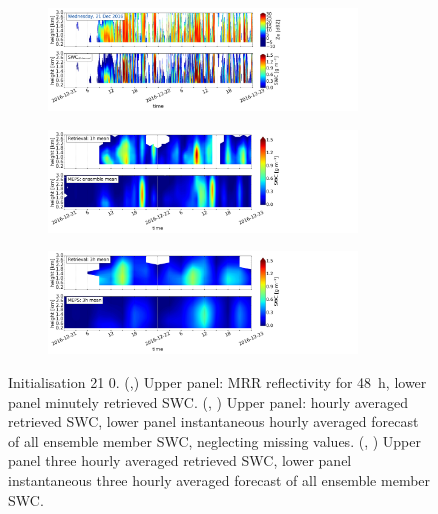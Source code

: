 \begin{figure}[ht!]
	\centering
	\begin{subfigure}[t]{\textwidth}
		\centering
		\includegraphics[trim={0.cm 2.2cm 19.cm 0.5cm},clip,width=0.9\textwidth]{./fig_obs_ret/20161221}
		\caption{}\label{fig:SWC:ret_21}
	\end{subfigure}
	\begin{subfigure}[t]{\textwidth}
		\centering
		\includegraphics[trim={0.cm 2.2cm 19.cm 0.5cm},clip,width=0.9\textwidth]{./fig_vert_SWC_EM/20161221}
		\caption{}\label{fig:SWC_EM:21}
	\end{subfigure}
	\begin{subfigure}[t]{\textwidth}
		\centering
		\includegraphics[trim={0.cm 0.8cm 19.cm 0.5cm},clip,width=0.9\textwidth]{./fig_vert_SWC_3h/20161221}
		\caption{}\label{fig:SWC3h:21}
	\end{subfigure}
	\caption{Initialisation \SI{21}{\dec} \SI{0}{\UTC}. 
		(\protect{},\protect{}) Upper panel: MRR reflectivity for \SI{48}{\hour}, lower panel minutely retrieved SWC. 
		(\protect{}, \protect{}) Upper panel: hourly averaged retrieved SWC, lower panel instantaneous hourly averaged forecast of all ensemble member SWC, neglecting missing values. 
		(\protect{}, \protect{}) Upper panel three hourly averaged retrieved SWC, lower panel instantaneous three hourly averaged forecast of all ensemble member SWC.   }\label{fig:ret:SWC21_24}
\end{figure}

